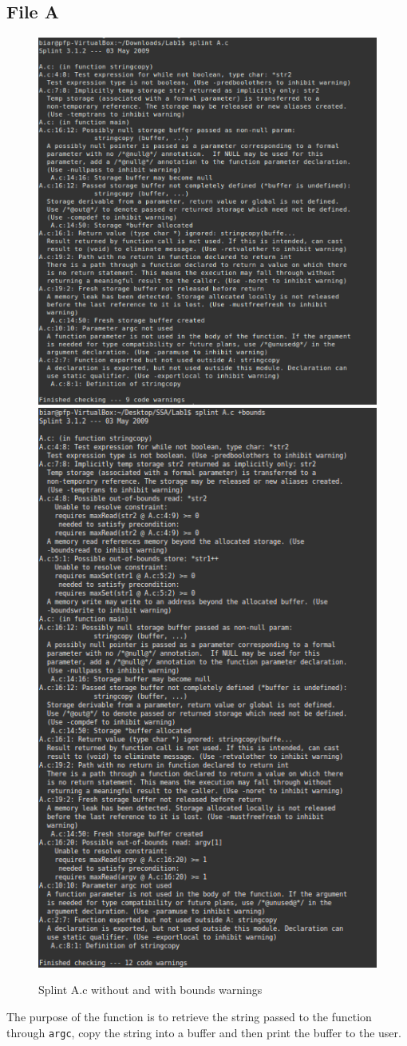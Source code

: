 \documentclass[a4paper]{article}
\begin{document}
\subsection*{File A}
\begin{figure}[h!]
    \centering
    \includegraphics[width=0.4\linewidth]{screen-A}\quad\includegraphics[width=0.4\linewidth]{A-bound}
    \caption{Splint A.c without and with bounds warnings}
\end{figure}

The purpose of the function is to retrieve the string passed to the function through \texttt{argc},
copy the string into a buffer and then print the buffer to the user.
\end{document}
